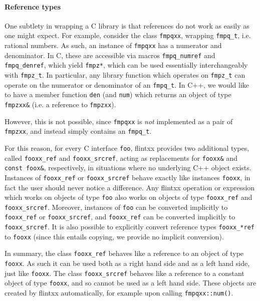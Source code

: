 \documentclass[a4paper,10pt]{book}
\newcommand{\code}{\lstinline}
\begin{document}
{{\paragraph{Reference types}

One subtlety in wrapping a C library is that references do not work as easily as
one might expect. For example, consider the class \code{fmpqxx}, wrapping
\code{fmpq_t}, i.e. rational numbers. As such, an instance of \code{fmpqxx} has a
numerator and denominator. In C, these are accessible via macros
\code{fmpq_numref} and \code{fmpq_denref}, which yield \code{fmpz*}, which can
be used essentially interchangeably with \code{fmpz_t}. In particular, any
library function which operates on \code{fmpz_t} can operate on the numerator or
denominator of an \code{fmpq_t}. In C++, we would like to have a member function
\code{den} (and \code{num}) which returns an object of type \code{fmpzxx&} (i.e.
a reference to \code{fmpzxx}).

However, this is not possible, since \code{fmpqxx} is \emph{not} implemented as
a pair of \code{fmpzxx}, and instead simply contains an \code{fmpq_t}.

For this reason, for every C interface \code{foo}, flintxx provides two
additional types, called \code{fooxx_ref} and \code{fooxx_srcref}, acting as
replacements for \code{fooxx&} and \code{const foox&}, respectively, in
situations where no underlying C++ object exists. Instances
of \code{fooxx_ref} or \code{fooxx_srcref} behave exactly like instances
\code{fooxx}, in fact the user should never notice a difference. Any flintxx
operation or expression which works on objects of type \code{foo} also works on
objects of type \code{fooxx_ref} and \code{fooxx_srcref}. Moreover, instances
of \code{foo} can be converted implicitly to \code{fooxx_ref} or
\code{fooxx_srcref}, and \code{fooxx_ref} can be converted implicitly to
\code{fooxx_srcref}. It is also possible to explicitly convert reference types
\code{fooxx_*ref} to \code{fooxx} (since this entails copying, we provide no
implicit conversion).

In summary, the class \code{fooxx_ref} behaves like a reference to an object of
type \code{fooxx}. As such it can be used both as a right hand side and as a
left hand side, just like \code{fooxx}. The class \code{fooxx_srcref} behaves
like a reference to a constant object of type \code{fooxx}, and so cannot be
used as a left hand side. These objects are created by flintxx automatically,
for example upon calling \code{fmpqxx::num()}.

}}
\end{document}
